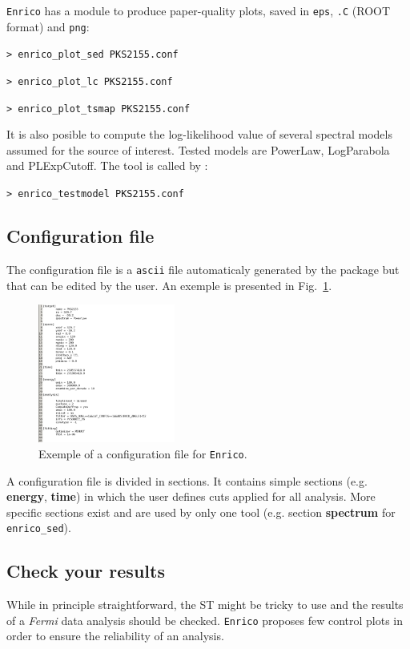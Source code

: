 \documentclass[a4paper]{article}
\newcommand{\Fermi}{\textit{Fermi} }
\begin{document}
{\tt Enrico} has a module to produce paper-quality plots, saved in {\tt eps}, {\tt .C} (ROOT format) and {\tt png}:

\mbox{{\tt> enrico\_plot\_sed PKS2155.conf}}

\mbox{{\tt> enrico\_plot\_lc PKS2155.conf}}

\mbox{{\tt> enrico\_plot\_tsmap PKS2155.conf}}


It is also posible to compute the log-likelihood value of several spectral models assumed for the source of interest. Tested models are PowerLaw, LogParabola and PLExpCutoff. The tool is called by :

\mbox{{\tt> enrico\_testmodel PKS2155.conf}}


\subsection{Configuration file}
The configuration file is a {\tt ascii} file automaticaly generated by the package but that can be edited by the user. An exemple is presented in Fig.~\ref{fig:conf}.

 \begin{figure}[t]
  \centering
  \includegraphics[width=0.4\textwidth]{icrc2013_89_03}
  \caption{Exemple of a configuration file for {\tt Enrico}.}
  \label{fig:conf}
 \end{figure}

A configuration file is divided in sections. It contains simple sections (e.g. \textbf{energy}, \textbf{time}) in which the user defines cuts applied for all analysis. More specific sections exist and are used by only one tool (e.g. section \textbf{spectrum} for {\tt enrico\_sed}).


\subsection{Check your results}

While in principle straightforward, the ST might be tricky to use and the results of a \Fermi data analysis should be checked. {\tt Enrico} proposes few control plots in order to ensure the reliability of an analysis. 
\end{document}
